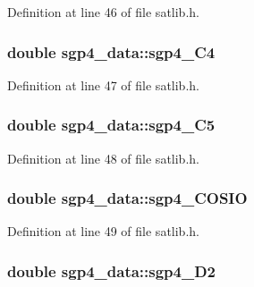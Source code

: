 Definition at line 46 of file satlib.\-h.

\hypertarget{structsgp4__data_aa12851802bc654472e447da7fc48088b}{
\subsubsection[{sgp4\-\_\-\-C4}]{\setlength{\rightskip}{0pt plus 5cm}double sgp4\-\_\-data\-::sgp4\-\_\-\-C4}}\label{structsgp4__data_aa12851802bc654472e447da7fc48088b}


Definition at line 47 of file satlib.\-h.

\hypertarget{structsgp4__data_a208d5c222fb10621dfe6fad7c2c78abe}{
\subsubsection[{sgp4\-\_\-\-C5}]{\setlength{\rightskip}{0pt plus 5cm}double sgp4\-\_\-data\-::sgp4\-\_\-\-C5}}\label{structsgp4__data_a208d5c222fb10621dfe6fad7c2c78abe}


Definition at line 48 of file satlib.\-h.

\hypertarget{structsgp4__data_a5d43c67edb80a3e15b251f6792c6b222}{
\subsubsection[{sgp4\-\_\-\-C\-O\-S\-I\-O}]{\setlength{\rightskip}{0pt plus 5cm}double sgp4\-\_\-data\-::sgp4\-\_\-\-C\-O\-S\-I\-O}}\label{structsgp4__data_a5d43c67edb80a3e15b251f6792c6b222}


Definition at line 49 of file satlib.\-h.

\hypertarget{structsgp4__data_afc21e64f4c8ce2fb1163ffdac7fdc9b8}{
\subsubsection[{sgp4\-\_\-\-D2}]{\setlength{\rightskip}{0pt plus 5cm}double sgp4\-\_\-data\-::sgp4\-\_\-\-D2}}\label{structsgp4__data_afc21e64f4c8ce2fb1163ffdac7fdc9b8}


